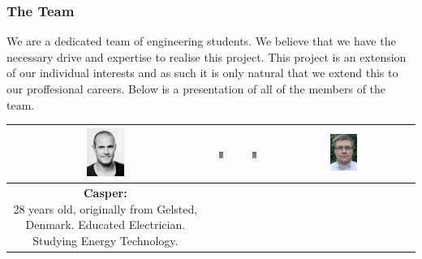 \subsubsection{The Team}
We are a dedicated team of engineering students. We believe that we have the necessary drive and expertise to realise this project. This project is an extension of our individual interests and as such it is only natural that we extend this to our proffesional careers. Below is a presentation of all of the members of the team.

\begin{table}[h]
\centering
\begin{tabular}{|c|c|c|c|}
\hline
\includegraphics[width=0.2\textwidth]{graphics/cgopic} & %
\includegraphics[width=0.2\textwidth]{graphics/AnonProfile} & %
\includegraphics[width=0.2\textwidth]{graphics/AnonProfile} & %
\includegraphics[width=0.2\textwidth]{graphics/Nikolaj_profile} \\ \hline %
\parbox[t] {0.2\textwidth}{
\textbf{Casper:} \\
28 years old, originally from Gelsted, Denmark. Educated Electrician. Studying Energy Technology.
}


\end{tabular}
\end{table}
